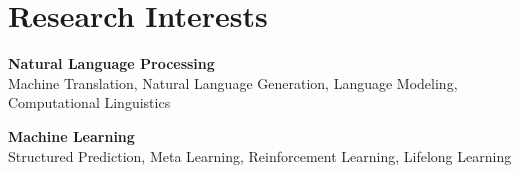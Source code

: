 
\section{\sc Research Interests}

{\bf Natural Language Processing} \\
Machine Translation,
Natural Language Generation,
Language Modeling,
Computational Linguistics

{\bf Machine Learning} \\
Structured Prediction,
Meta Learning,
Reinforcement Learning,
Lifelong Learning
